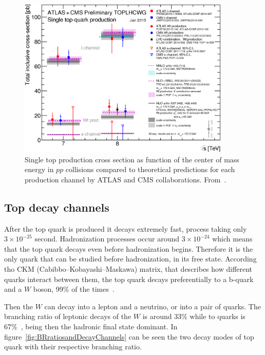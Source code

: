 \begin{figure}[!Hhtbp]
  \begin{center}
    \includegraphics[width=0.9\textwidth]{figs/singletop_allchanvsroots.png}
    \caption{Single top production cross section as function of the center of mass energy in $pp$ collisions compared to theoretical predictions for each production channel by ATLAS and CMS collaborations. From~\cite{TOPLHCWG}.}
    \label{fig:SingleProduction}
  \end{center}
\end{figure}


\subsection{Top decay channels}

After the top quark is produced it decays extremely fast, process taking only $3\times 10^{-25}$ second. Hadronization processes occur around $3\times 10^{-24}$ which means that the top quark decays even before hadronization begins. Therefore it is the only quark that can be studied before hadronization, in its free state. According tho CKM (Cabibbo–Kobayashi–Maskawa) matrix, that describes how different quarks interact between them, the top quark decays preferentially to a b-quark and a $W$ boson, 99\% of the times~\cite{Agashe:2014kda}. 

Then the $W$ can decay into a lepton and a neutrino, or into a pair of quarks. The branching ratio of leptonic decays of the $W$ is around 33\% while to quarks is 67\%~\cite{Agashe:2014kda}, being then the hadronic final state dominant. In figure~\ref{fig:BRratiosandDecayChannels} can be seen the two decay modes of top quark with their respective branching ratio. 


